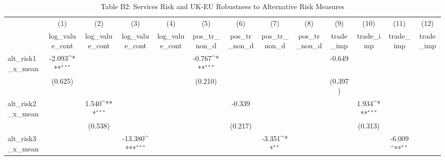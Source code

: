 \begin{table}[htbp]\centering
\def\sym#1{\ifmmode^{#1}\else\(^{#1}\)\fi}
\caption{Table B2: Services Risk and UK-EU Robustness to Alternative Risk Measures}
\begin{tabular}{l*{12}{c}}
\hline\hline
            &\multicolumn{1}{c}{(1)}&\multicolumn{1}{c}{(2)}&\multicolumn{1}{c}{(3)}&\multicolumn{1}{c}{(4)}&\multicolumn{1}{c}{(5)}&\multicolumn{1}{c}{(6)}&\multicolumn{1}{c}{(7)}&\multicolumn{1}{c}{(8)}&\multicolumn{1}{c}{(9)}&\multicolumn{1}{c}{(10)}&\multicolumn{1}{c}{(11)}&\multicolumn{1}{c}{(12)}\\
            &\multicolumn{1}{c}{log\_value\_cont}&\multicolumn{1}{c}{log\_value\_cont}&\multicolumn{1}{c}{log\_value\_cont}&\multicolumn{1}{c}{log\_value\_cont}&\multicolumn{1}{c}{pos\_tr\_non\_d}&\multicolumn{1}{c}{pos\_tr\_non\_d}&\multicolumn{1}{c}{pos\_tr\_non\_d}&\multicolumn{1}{c}{pos\_tr\_non\_d}&\multicolumn{1}{c}{trade\_imp}&\multicolumn{1}{c}{trade\_imp}&\multicolumn{1}{c}{trade\_imp}&\multicolumn{1}{c}{trade\_imp}\\
\hline
alt\_risk1\_x\_mean&      -2.093\sym{***}&                     &                     &                     &      -0.767\sym{***}&                     &                     &                     &      -0.649         &                     &                     &                     \\
            &     (0.625)         &                     &                     &                     &     (0.210)         &                     &                     &                     &     (0.397)         &                     &                     &                     \\
[1em]
alt\_risk2\_x\_mean&                     &       1.540\sym{***}&                     &                     &                     &      -0.339         &                     &                     &                     &       1.934\sym{***}&                     &                     \\
            &                     &     (0.538)         &                     &                     &                     &     (0.217)         &                     &                     &                     &     (0.313)         &                     &                     \\
[1em]
alt\_risk3\_x\_mean&                     &                     &     -13.380\sym{***}&                     &                     &                     &      -3.351\sym{**} &                     &                     &                     &      -6.009\sym{**} &                     \\

\end{tabular}
\end{table}
